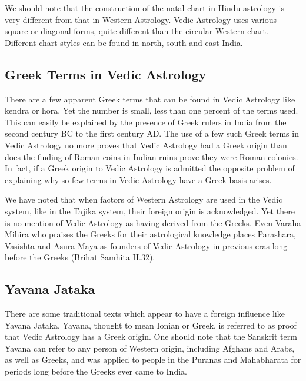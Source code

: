  

We should note that the construction of the natal chart in Hindu astrology is very different from that in Western Astrology. Vedic Astrology uses various square or diagonal forms, quite different than the circular Western chart. Different chart styles can be found in north, south and east India.

 

\subsection{Greek Terms in Vedic Astrology}

 

There are a few apparent Greek terms that can be found in Vedic Astrology like kendra or hora. Yet the number is small, less than one percent of the terms used. This can easily be explained by the presence of Greek rulers in India from the second century BC to the first century AD. The use of a few such Greek terms in Vedic Astrology no more proves that Vedic Astrology had a Greek origin than does the finding of Roman coins in Indian ruins prove they were Roman colonies. In fact, if a Greek origin to Vedic Astrology is admitted the opposite problem of explaining why so few terms in Vedic Astrology have a Greek basis arises.

 

We have noted that when factors of Western Astrology are used in the Vedic system, like in the Tajika system, their foreign origin is acknowledged. Yet there is no mention of Vedic Astrology as having derived from the Greeks. Even Varaha Mihira who praises the Greeks for their astrological knowledge places Parashara, Vasishta and Asura Maya as founders of Vedic Astrology in previous eras long before the Greeks (Brihat Samhita II.32).

 

\subsection{Yavana Jataka}

 

There are some traditional texts which appear to have a foreign influence like Yavana Jataka. Yavana, thought to mean Ionian or Greek, is referred to as proof that Vedic Astrology has a Greek origin. One should note that the Sanskrit term Yavana can refer to any person of Western origin, including Afghans and Arabs, as well as Greeks, and was applied to people in the Puranas and Mahabharata for periods long before the Greeks ever came to India.

